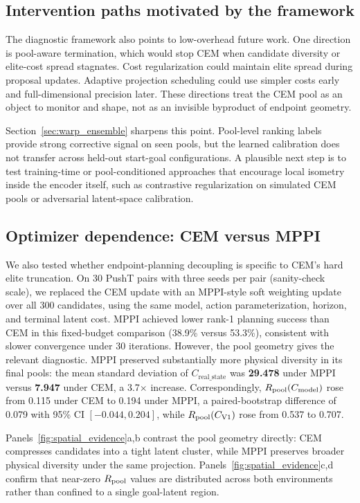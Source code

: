 \subsection{Intervention paths motivated by the framework}

The diagnostic framework also points to low-overhead future work. One direction is pool-aware termination, which would stop CEM when candidate diversity or elite-cost spread stagnates. Cost regularization could maintain elite spread during proposal updates. Adaptive projection scheduling could use simpler costs early and full-dimensional precision later. These directions treat the CEM pool as an object to monitor and shape, not as an invisible byproduct of endpoint geometry.

Section~\ref{sec:warp_ensemble} sharpens this point. Pool-level ranking labels provide strong corrective signal on seen pools, but the learned calibration does not transfer across held-out start-goal configurations. A plausible next step is to test training-time or pool-conditioned approaches that encourage local isometry inside the encoder itself, such as contrastive regularization on simulated CEM pools or adversarial latent-space calibration.

\subsection{Optimizer dependence: CEM versus MPPI}
\label{sec:mppi}

We also tested whether endpoint-planning decoupling is specific to CEM's hard elite truncation. On 30 PushT pairs with three seeds per pair (sanity-check scale), we replaced the CEM update with an MPPI-style soft weighting update over all 300 candidates, using the same model, action parameterization, horizon, and terminal latent cost. MPPI achieved lower rank-1 planning success than CEM in this fixed-budget comparison (38.9\% versus 53.3\%), consistent with slower convergence under 30 iterations. However, the pool geometry gives the relevant diagnostic. MPPI preserved substantially more physical diversity in its final pools: the mean standard deviation of $C_\mathrm{real\_state}$ was \textbf{29.478} under MPPI versus \textbf{7.947} under CEM, a 3.7$\times$ increase. Correspondingly, $R_\text{pool}(C_\text{model})$ rose from 0.115 under CEM to 0.194 under MPPI, a paired-bootstrap difference of 0.079 with 95\% CI $[-0.044,0.204]$, while $R_\text{pool}(C_\mathrm{V1})$ rose from 0.537 to 0.707.

Panels~\ref{fig:spatial_evidence}a,b contrast the pool geometry directly: CEM compresses candidates into a tight latent cluster, while MPPI preserves broader physical diversity under the same projection. Panels~\ref{fig:spatial_evidence}c,d confirm that near-zero $R_\text{pool}$ values are distributed across both environments rather than confined to a single goal-latent region.


